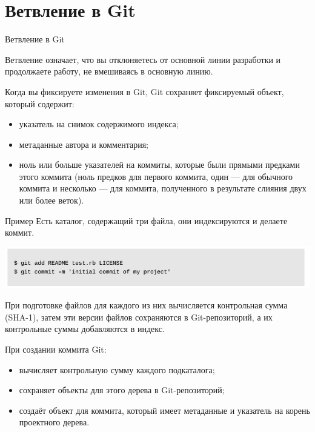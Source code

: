 \documentclass{beamer}
\begin{document}
\section{Ветвление в Git}
\begin{frame}{Ветвление в Git}
\begin{block}{Ветвление }
означает, что вы отклоняетесь от основной линии разработки и продолжаете работу, не вмешиваясь в
основную линию. 
\end{block}
Когда вы фиксируете изменения в Git, Git сохраняет фиксируемый объект, который содержит:
\begin{itemize}
\item указатель на снимок содержимого индекса;
\item метаданные автора и комментария;
\item ноль или больше указателей на коммиты, которые были прямыми предками этого коммита (ноль предков для
первого коммита, один — для обычного коммита и несколько — для коммита, полученного в
результате слияния двух или более веток).
\end{itemize}
\end{frame}

\begin{frame}{Пример}
Есть каталог, содержащий три файла, они индексируются и делаете коммит. 
\begin{center}
\includegraphics[scale=0.5]{images/branch-01.png}
\end{center}
При подготовке файлов для каждого из них вычисляется контрольная сумма (SHA-1), затем эти версии файлов сохраняются в Git-репозиторий, а их контрольные суммы добавляются в индекс.

При создании коммита Git:
\begin{itemize}
\item вычисляет контрольную сумму каждого подкаталога;
\item сохраняет объекты для этого дерева в Git-репозиторий;
\item создаёт объект для коммита, который имеет метаданные и указатель на корень проектного дерева. 
\end{itemize}
\end{frame}
\end{document}
